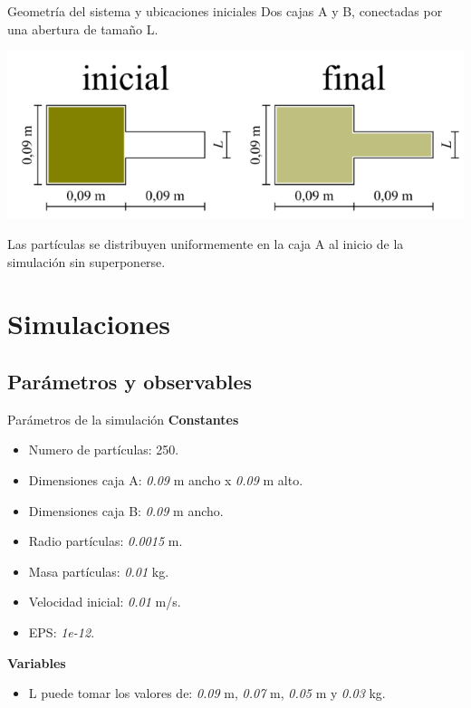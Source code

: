 \documentclass{beamer}
\begin{document}
\begin{frame}{Geometría del sistema y ubicaciones iniciales}
  \small Dos cajas A y B, conectadas por una abertura de tamaño L.

  \vspace{0.5cm}
  \begin{center}
    \includegraphics[width=0.5\linewidth]{photoMaterial/geometria.jpg}
  \end{center}
  \vspace{0.5cm}

  \small Las partículas se distribuyen uniformemente en la caja A al inicio de la simulación sin superponerse.
\end{frame}

\section{Simulaciones}
\subsection{Parámetros y observables}
\begin{frame}{Parámetros de la simulación}
  \textbf{Constantes}
    \begin{itemize}
      \item Numero de partículas: 250.
      \item Dimensiones caja A: \textit{0.09} m ancho x \textit{0.09} m alto.
      \item Dimensiones caja B: \textit{0.09} m ancho.
      \item Radio partículas: \textit{0.0015} m.
      \item Masa partículas: \textit{0.01} kg.
      \item Velocidad inicial: \textit{0.01} m/s.
      \item EPS: \textit{1e-12}.
    \end{itemize}
    \vspace{0.5cm}
    \textbf{Variables}
    \begin{itemize}
      \item L puede tomar los valores de: \textit{0.09} m, \textit{0.07} m, \textit{0.05} m y \textit{0.03} kg.
    \end{itemize}
  \end{frame}
\end{document}
